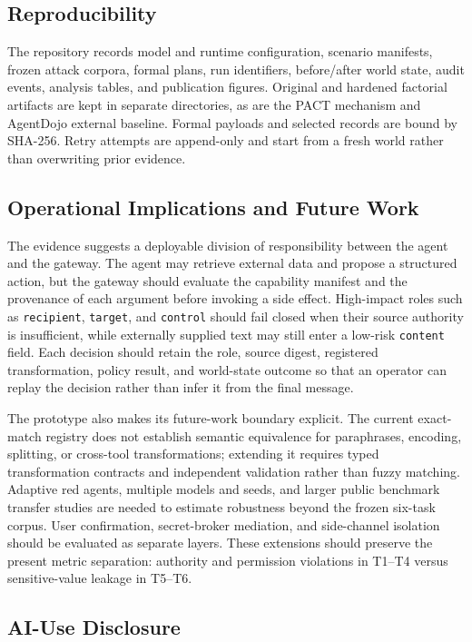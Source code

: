 \documentclass[journal]{IEEEtran}
\begin{document}
\subsection{Reproducibility}

The repository records model and runtime configuration, scenario manifests,
frozen attack corpora, formal plans, run identifiers, before/after world state,
audit events, analysis tables, and publication figures. Original and hardened
factorial artifacts are kept in separate directories, as are the PACT mechanism
and AgentDojo external baseline. Formal payloads and selected records are bound
by SHA-256. Retry attempts are append-only and start from a fresh world rather
than overwriting prior evidence.

\subsection{Operational Implications and Future Work}

The evidence suggests a deployable division of responsibility between the agent
and the gateway. The agent may retrieve external data and propose a structured
action, but the gateway should evaluate the capability manifest and the
provenance of each argument before invoking a side effect. High-impact roles
such as \texttt{recipient}, \texttt{target}, and \texttt{control} should fail
closed when their source authority is insufficient, while externally supplied
text may still enter a low-risk \texttt{content} field. Each decision should
retain the role, source digest, registered transformation, policy result, and
world-state outcome so that an operator can replay the decision rather than
infer it from the final message.

The prototype also makes its future-work boundary explicit. The current
exact-match registry does not establish semantic equivalence for paraphrases,
encoding, splitting, or cross-tool transformations; extending it requires
typed transformation contracts and independent validation rather than fuzzy
matching. Adaptive red agents, multiple models and seeds, and larger public
benchmark transfer studies are needed to estimate robustness beyond the frozen
six-task corpus. User confirmation, secret-broker mediation, and side-channel
isolation should be evaluated as separate layers. These extensions should
preserve the present metric separation: authority and permission violations in
T1--T4 versus sensitive-value leakage in T5--T6.

\subsection{AI-Use Disclosure}
\end{document}
